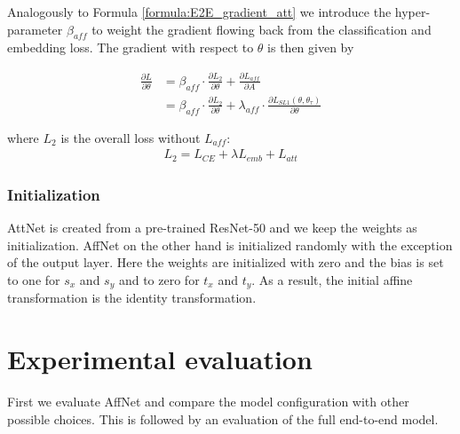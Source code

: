 \documentclass{bmvc2k}
\begin{document}
Analogously to Formula \ref{formula:E2E_gradient_att} we introduce the hyper-parameter $\beta_{aff}$ to weight the gradient flowing back from the classification and embedding loss. The gradient with respect to $\theta$ is then given by

\begin{align}
  \label{formula:E2E_gradient_aff}
  \frac{\partial L}{\partial \theta} &= \beta_{aff} \cdot \frac{\partial L_{2}}{\partial \theta} + \frac{\partial L_{aff}}{\partial A} \\
                                     &= \beta_{aff} \cdot \frac{\partial L_{2}}{\partial \theta} + \lambda_{aff} \cdot \frac{\partial L_{SL1}(\theta,\theta_{\tau})}{\partial \theta}
\end{align}

where $L_{2}$ is the overall loss without $L_{aff}$:
\begin{align}
  \label{formula:E2E_tmp1}
  L_{2} = L_{CE} + \lambda L_{emb} + L_{att}
\end{align}


\subsubsection{Initialization}
AttNet is created from a pre-trained ResNet-50 and we keep the weights as initialization. AffNet on the other hand is initialized randomly with the exception of the output layer. Here the weights are initialized with zero and the bias is set to one for $s_x$ and $s_y$ and to zero for $t_x$ and $t_y$. As a result, the initial affine transformation is the identity transformation.

\section{Experimental evaluation}
First we evaluate AffNet and compare the model configuration with other possible choices. This is followed by an evaluation of the full end-to-end model.
\end{document}
